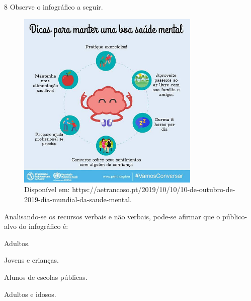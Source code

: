 \num{8} Observe o infográfico a seguir.

\begin{figure}[H]
\centering\includegraphics[width=3.43333in,height=3.37681in]{./imgSAEB_6_POR/media/image15.jpeg}
\caption{Disponível em: https://aetrancoso.pt/2019/10/10/10-de-outubro-de-2019-dia-mundial-da-saude-mental.}
\end{figure}

\noindent Analisando-se os recursos verbais e não verbais, pode-se afirmar que o
público-alvo do infográfico é:

\begin{escolha}
\item Adultos.
\item Jovens e crianças.
\item Alunos de escolas públicas.
\item Adultos e idosos.
\end{escolha}



